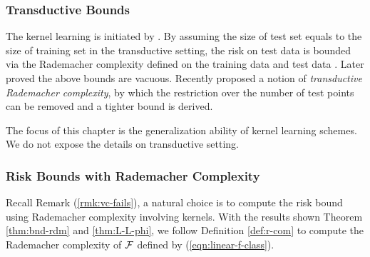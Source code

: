 \subsubsection{Transductive Bounds}

The kernel learning is initiated by \cite{icml/LanckrietCBGJ02}. By assuming the size of test set equals to the size of training set in the transductive setting, the risk on test data is bounded via the Rademacher complexity defined on the training data and test data \cite{icml/LanckrietCBGJ02,jmlr/LanckrietCBGJ03,nips/BousquetH02}.
Later \cite{colt/SrebroB06} proved the above bounds are vacuous. Recently
\cite{colt/El-YanivP07} proposed a notion of {\em transductive Rademacher
complexity}, by which the restriction over the number of test points can be removed and a tighter bound is derived.

The focus of this chapter is the generalization ability of kernel learning schemes. We do not expose the details on transductive setting.

\subsubsection{Risk Bounds with Rademacher Complexity}

Recall Remark (\ref{rmk:vc-fails}), a natural choice is to compute the risk bound using Rademacher complexity involving kernels. With the results shown Theorem \ref{thm:bnd-rdm} and \ref{thm:L-L-phi}, we follow Definition \ref{def:r-com} to compute the Rademacher complexity of ${\cal F}$ defined by (\ref{eqn:linear-f-class}).

